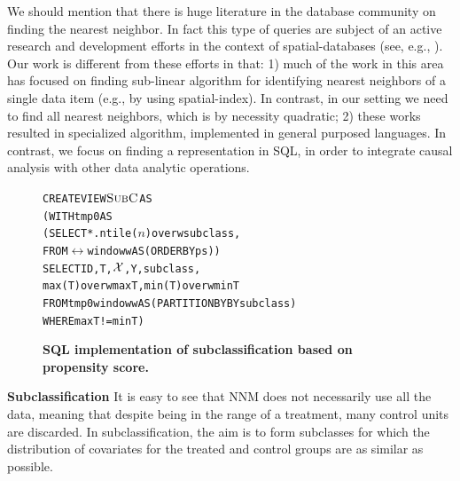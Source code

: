 {We should mention that there is huge literature in the database
community on finding the nearest neighbor. In fact this type of
queries are subject of an active research and development efforts in
the context of spatial-databases (see, e.g.,
\cite{obe2015postgis}). Our work is different from these efforts in that: 1) much of the work in this area has focused on finding sub-linear algorithm for identifying nearest neighbors of a single data item (e.g., by using spatial-index). In contrast, in our setting
we need to find all nearest neighbors, which is by necessity quadratic; 2) these works resulted in specialized algorithm,
implemented in general purposed languages. In contrast, we focus on finding a representation in SQL, in order to integrate causal
 analysis with other data analytic operations.  

}









\begin{figure}
\begin{alltt} \scriptsize
CREATE VIEW \(\sbc\) AS
(WITH tmp0 AS
  (SELECT *. ntile(\(n\)) over w subclass,
   FROM \(\rel\) window w AS (ORDER BY ps))
SELECT ID, T, \(\ccv\), Y, subclass,
             max(T) over w maxT, min(T) over w minT
FROM tmp0  window w AS (PARTITION BY BY subclass)
WHERE maxT!=minT)
\end{alltt}
\vspace{-0.3cm}
  \caption{\bf{SQL implementation of subclassification based on
      propensity score.}}\label{fig:subpr}
\end{figure}


{\bf Subclassification}
\label{sec:sub}
It is easy to see that NNM does not necessarily use all the data,
meaning that despite being in the range of a
treatment, many control units are discarded.  In subclassification, the aim is to
form subclasses for which the distribution of covariates for the
treated and control groups are as similar as possible.  


